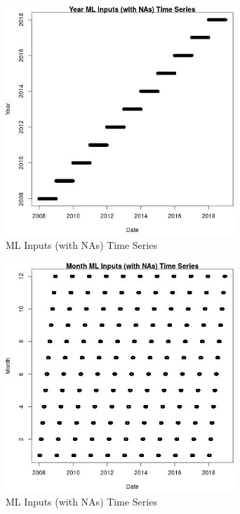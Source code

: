 \begin{figure} 
\centering  
\includegraphics[width=0.77\textwidth]{Code_Outputs/Report_ML_input_PM25_Step4_part_e_de_duplicated_aveswNAs_YearvDate.jpg} 
\caption{\label{fig:Report_ML_input_PM25_Step4_part_e_de_duplicated_aveswNAsYearvDate}ML Inputs (with NAs) Time Series} 
\end{figure} 
 

\begin{figure} 
\centering  
\includegraphics[width=0.77\textwidth]{Code_Outputs/Report_ML_input_PM25_Step4_part_e_de_duplicated_aveswNAs_MonthvDate.jpg} 
\caption{\label{fig:Report_ML_input_PM25_Step4_part_e_de_duplicated_aveswNAsMonthvDate}ML Inputs (with NAs) Time Series} 
\end{figure} 
 

